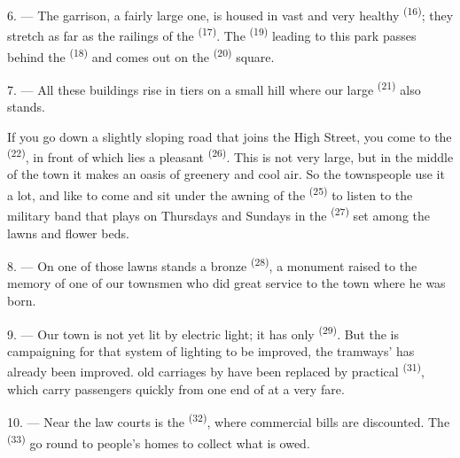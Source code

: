 \VUsaut{5.0mm}
\VUsaut{3.4mm}

6. --- The garrison, a fairly large one, is housed in vast and very healthy 
\textsuperscript{(16)}; they stretch as far as the railings of the 
\textsuperscript{(17)}. The  \textsuperscript{(19)} leading to this park
passes behind the  \textsuperscript{(18)} and comes out on the
 \textsuperscript{(20)} square.

7. --- All these buildings rise in tiers on a small hill where our large
 \textsuperscript{(21)} also stands.

If you go down a slightly sloping road that joins the High Street, you come to the
 \textsuperscript{(22)}, in front of which lies a pleasant
 \textsuperscript{(26)}. This  is not very large, but in
the middle of the town it makes an oasis of greenery and cool air. So the townspeople use it a
lot, and like to come and sit under the awning of the  \textsuperscript{(25)} to
listen to the military band that plays on Thursdays and Sundays in the
 \textsuperscript{(27)} set among the lawns and flower beds.

8. --- On one of those lawns stands a bronze  \textsuperscript{(28)}, a
monument raised to the memory of one of our townsmen who did great service to the town where
he was born.

\VUsaut{4.0mm}
\VUsaut{3.4mm}

9. --- Our town is not yet lit by electric light; it has only
 \textsuperscript{(29)}. But the  is campaigning
for that system of lighting to be improved,  the tramways'
 has already been improved.  old
carriages  by  have been replaced by practical
 \textsuperscript{(31)}, which carry passengers quickly from one
end of  at a very  fare.

10. --- Near the law courts is the  \textsuperscript{(32)}, where commercial
bills are discounted. The  \textsuperscript{(33)} go round to people's
homes to collect what is owed.

